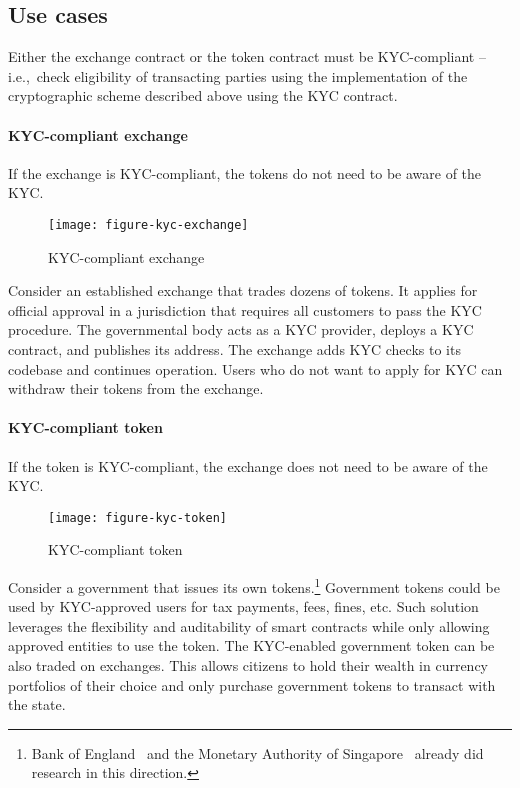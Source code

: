 \subsection{Use cases}

Either the exchange contract or the token contract must be KYC-compliant -- i.e.,~check eligibility of transacting parties using the implementation of the cryptographic scheme described above using the KYC contract.

\paragraph{KYC-compliant exchange}

If the exchange is KYC-compliant, the tokens do not need to be aware of the KYC.

\begin{figure}[h]
	\caption{KYC-compliant exchange}
	\centering
	\texttt{[image: figure-kyc-exchange]}
\end{figure}

Consider an established exchange that trades dozens of tokens.
It applies for official approval in a jurisdiction that requires all customers to pass the KYC procedure.
The governmental body acts as a KYC provider, deploys a KYC contract, and publishes its address.
The exchange adds KYC checks to its codebase and continues operation.
Users who do not want to apply for KYC can withdraw their tokens from the exchange.


\paragraph{KYC-compliant token}

If the token is KYC-compliant, the exchange does not need to be aware of the KYC.

\begin{figure}[h]
	\caption{KYC-compliant token}
	\centering
	\texttt{[image: figure-kyc-token]}
\end{figure}

Consider a government that issues its own tokens.\footnote{Bank of England~\cite{Danezis2016} and the Monetary Authority of Singapore~\cite{Singapore17} already did research in this direction.}
Government tokens could be used by KYC-approved users for tax payments, fees, fines, etc.
Such solution leverages the flexibility and auditability of smart contracts while only allowing approved entities to use the token.
The KYC-enabled government token can be also traded on exchanges.
This allows citizens to hold their wealth in currency portfolios of their choice and only purchase government tokens to transact with the state.

